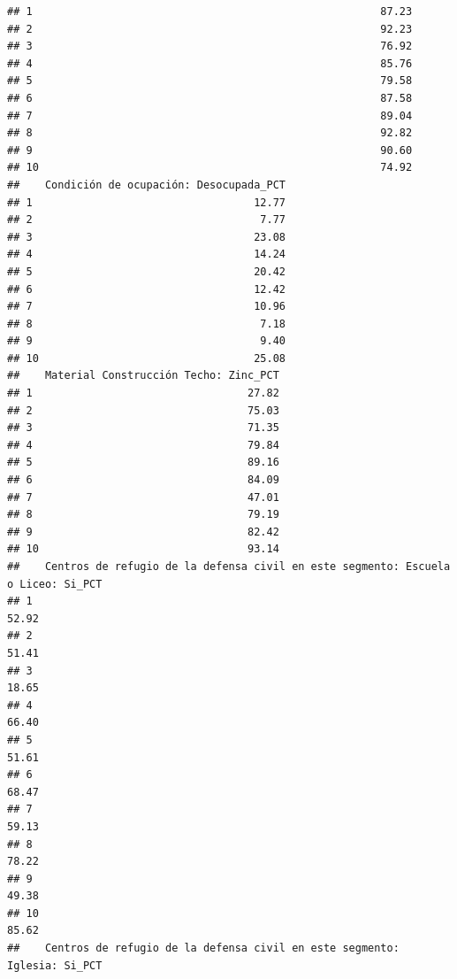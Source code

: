\documentclass[11pt,]{article}
\begin{document}
\begin{verbatim}
## 1                                                       87.23
## 2                                                       92.23
## 3                                                       76.92
## 4                                                       85.76
## 5                                                       79.58
## 6                                                       87.58
## 7                                                       89.04
## 8                                                       92.82
## 9                                                       90.60
## 10                                                      74.92
##    Condición de ocupación: Desocupada_PCT
## 1                                   12.77
## 2                                    7.77
## 3                                   23.08
## 4                                   14.24
## 5                                   20.42
## 6                                   12.42
## 7                                   10.96
## 8                                    7.18
## 9                                    9.40
## 10                                  25.08
##    Material Construcción Techo: Zinc_PCT
## 1                                  27.82
## 2                                  75.03
## 3                                  71.35
## 4                                  79.84
## 5                                  89.16
## 6                                  84.09
## 7                                  47.01
## 8                                  79.19
## 9                                  82.42
## 10                                 93.14
##    Centros de refugio de la defensa civil en este segmento: Escuela o Liceo: Si_PCT
## 1                                                                             52.92
## 2                                                                             51.41
## 3                                                                             18.65
## 4                                                                             66.40
## 5                                                                             51.61
## 6                                                                             68.47
## 7                                                                             59.13
## 8                                                                             78.22
## 9                                                                             49.38
## 10                                                                            85.62
##    Centros de refugio de la defensa civil en este segmento: Iglesia: Si_PCT

\end{verbatim}
\end{document}
